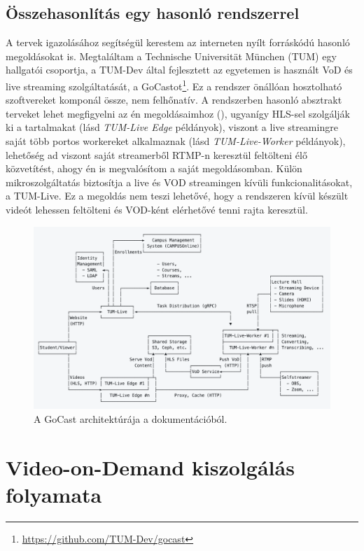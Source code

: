 \subsection{Összehasonlítás egy hasonló rendszerrel}

A tervek igazolásához segítségül kerestem az interneten nyílt forráskódú hasonló megoldásokat is. Megtaláltam a Technische Universität München (TUM) egy hallgatói csoportja, a TUM-Dev által fejlesztett az egyetemen is használt VoD és live streaming szolgáltatását, a GoCastot\footnote{\url{https://github.com/TUM-Dev/gocast}}. Ez a rendszer önállóan hosztolható szoftvereket komponál össze, nem felhőnatív. A rendszerben hasonló absztrakt terveket lehet megfigyelni az én megoldásaimhoz (), ugyanígy HLS-sel szolgálják ki a tartalmakat (lásd \emph{TUM-Live Edge} példányok), viszont a live streamingre saját több portos workereket alkalmaznak (lásd \emph{TUM-Live-Worker} példányok), lehetőség ad viszont saját streamerből RTMP-n keresztül feltölteni élő közvetítést, ahogy én is megvalósítom a saját megoldásomban. Külön mikroszolgáltatás biztosítja a live és VOD streamingen kívüli funkcionalitásokat, a TUM-Live. Ez a megoldás nem teszi lehetővé, hogy a rendszeren kívül készült videót lehessen feltölteni és VOD-ként elérhetővé tenni rajta keresztül.

\begin{figure}[ht]
	\centering
	\includegraphics[width=140mm, keepaspectratio]{figures/gocast.png}
	\caption{A GoCast architektúrája a dokumentációból.}
	\label{fig:gocast}
\end{figure}

\section{Video-on-Demand kiszolgálás folyamata}

